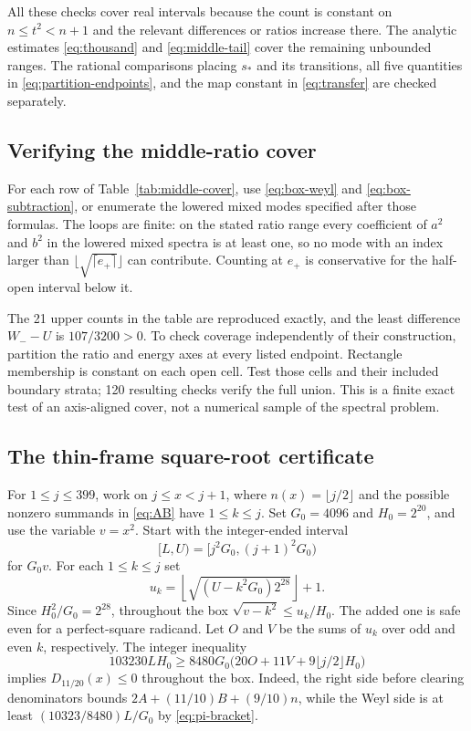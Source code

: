 \documentclass[11pt,reqno]{amsart}
\numberwithin{equation}{section}
\newcommand{\sstar}{s_*}
\begin{document}
All these checks cover real intervals because the count
is constant on $n\le t^2<n+1$ and the relevant differences
or ratios increase there. The analytic estimates
\eqref{eq:thousand} and \eqref{eq:middle-tail} cover the
remaining unbounded ranges. The rational comparisons
placing $\sstar$ and its transitions, all five quantities
in \eqref{eq:partition-endpoints}, and the map constant
in \eqref{eq:transfer} are checked separately.

\subsection*{Verifying the middle-ratio cover}

For each row of Table~\ref{tab:middle-cover}, use
\eqref{eq:box-weyl} and \eqref{eq:box-subtraction}, or
enumerate the lowered mixed modes specified after those
formulas. The loops are finite: on the stated ratio
range every coefficient of $a^2$ and $b^2$ in the lowered
mixed spectra is at least one, so no mode with an index
larger than $\lfloor\sqrt{\lceil e_+\rceil}\rfloor$ can
contribute. Counting at $e_+$ is conservative for the
half-open interval below it.

The 21 upper counts in the table are reproduced exactly,
and the least difference $W_--U$ is $107/3200>0$.
To check coverage independently of their construction,
partition the ratio and energy axes at every listed
endpoint. Rectangle membership is constant on each open
cell. Test those cells and their included boundary
strata; 120 resulting checks verify the full union.
This is a finite exact test of an axis-aligned cover,
not a numerical sample of the spectral problem.

\subsection*{The thin-frame square-root certificate}

For $1\le j\le399$, work on $j\le x<j+1$, where
$n(x)=\lfloor j/2\rfloor$ and the possible nonzero
summands in \eqref{eq:AB} have $1\le k\le j$.
Set $G_0=4096$ and $H_0=2^{20}$, and use the variable
$v=x^2$. Start with the integer-ended interval
\[
 [L,U)=[j^2G_0,(j+1)^2G_0)
\]
for $G_0v$. For each $1\le k\le j$ set
\begin{equation}\label{eq:root-upper}
 u_k=\left\lfloor\sqrt{(U-k^2G_0)2^{28}}\right\rfloor+1.
\end{equation}
Since $H_0^2/G_0=2^{28}$, throughout the box
$\sqrt{v-k^2}\le u_k/H_0$. The added one is safe even
for a perfect-square radicand. Let $O$ and $V$ be the
sums of $u_k$ over odd and even $k$, respectively.
The integer inequality
\begin{equation}\label{eq:thin-integer}
 103230LH_0\ge
 8480G_0\bigl(20O+11V+9\lfloor j/2\rfloor H_0\bigr)
\end{equation}
implies $D_{11/20}(x)\le0$ throughout the box. Indeed,
the right side before clearing denominators bounds
$2A+(11/10)B+(9/10)n$, while the Weyl side is at least
$(10323/8480)L/G_0$ by \eqref{eq:pi-bracket}.
\end{document}
